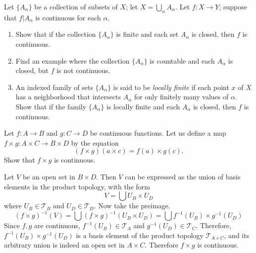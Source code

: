   \begin{exercise}[Munkres 18.9]
    Let $\{A_\alpha\}$ be a collection of subsets of $X$; let $X = \bigcup_\alpha A_\alpha$. Let $f : X \to Y$; suppose that $f|A_\alpha$ is continuous for each $\alpha$.
    \begin{enumerate}
      \item Show that if the collection $\{A_\alpha\}$ is finite and each set $A_\alpha$ is closed, then $f$ is continuous.
      \item Find an example where the collection $\{A_\alpha\}$ is countable and each $A_\alpha$ is closed, but $f$ is not continuous.
      \item An indexed family of sets $\{A_\alpha\}$ is said to be \textit{locally finite} if each point $x$ of $X$ has a neighborhood that intersects $A_\alpha$ for only finitely many values of $\alpha$. Show that if the family $\{A_\alpha\}$ is locally finite and each $A_\alpha$ is closed, then $f$ is continuous.
    \end{enumerate}
  \end{exercise}

  \begin{exercise}[Munkres 18.10]
    Let $f : A \to B$ and $g : C \to D$ be continuous functions. Let us define a map $f \times g : A \times C \to B \times D$ by the equation
    \begin{equation}
      (f \times g)(a \times c) = f(a) \times g(c).
    \end{equation}
    Show that $f \times g$ is continuous.
  \end{exercise}
  \begin{solution}
    Let $V$ be an open set in $B \times D$. Then $V$ can be expressed as the union of basis elements in the product topology, with the form 
    \begin{equation}
      V = \bigcup U_B \times U_D
    \end{equation}
    where $U_B \in \mathscr{T}_B$ and $U_D \in \mathscr{T}_D$. Now take the preimage. 
    \begin{equation}
      (f \times g)^{-1} (V) = \bigcup (f \times g)^{-1} (U_B \times U_D) = \bigcup f^{-1}(U_B) \times g^{-1} (U_D)
    \end{equation}
    Since $f, g$ are continuous, $f^{-1} (U_B) \in \mathscr{T}_A$ and $g^{-1} (U_D) \in \mathscr{T}_C$. Therefore, $f^{-1} (U_B) \times g^{-1} (U_D)$ is a basis element of the product topology $\mathscr{T}_{A \times C}$, and its arbitrary union is indeed an open set in $A \times C$. Therefore $f \times g$ is continuous.  
  \end{solution}


